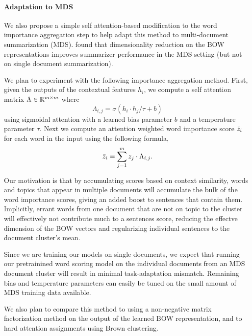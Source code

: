         \paragraph{Adaptation to MDS} We also propose a simple 
        self attention-based modification to
        the word importance aggregation step to help adapt this method
        to multi-document summarization (MDS). \citep{conroy} found
        that dimensionality reduction on the BOW representations improves
        summarizer performance in the MDS setting (but not on single document
        summarization). 


        We plan to experiment with the following importance 
        aggregation method. First, given the outputs of the contextual features
        $h_i$, we compute a self attention matrix $\Lambda \in \mathbb{R}^{m\times m}$
        where \[\Lambda_{i,j} = \sigma(h_i \cdot h_j / \tau + b)  \]
        using sigmoidal attention \cite{strucattn} with a learned bias 
        parameter $b$ and a temperature parameter $\tau$.
        Next we compute an attention weighted word importance score $\bar{z}_i$ for each word in the input using the following formula,
        \[ \bar{z}_i = \sum_{j=1}^m z_j \cdot \Lambda_{i,j}.\]

        Our motivation is that by accumulating scores based on context
        similarity, words and topics that appear in multiple documents 
        will accumulate the bulk of the word importance scores, giving 
        an added boost to sentences that contain them. Implicitly, errant
        words from one document that are not on topic to the cluster will
        effectively not contribute much to a sentences score, reducing the 
        effectve dimension of the BOW vectors and regularizing individual
        sentences to the document cluster's mean.

        
        Since we are training our models on single documents, we expect that
        running our pretrainined word scoring model on the individual 
        documents from an MDS document cluster will result in 
        minimal task-adaptation mismatch. Remaining bias and temperature
        parameters can easily be tuned on the small amount of MDS training 
        data available.

        We also plan to compare this method to using a non-negative matrix 
        factorization 
        method on the output of the learned BOW representation, 
        and to hard attention assignments using Brown clustering.









 

